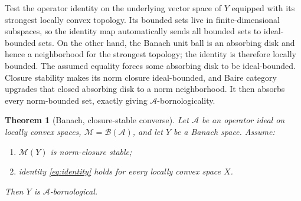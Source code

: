 \documentclass[11pt]{article}
\newtheorem{theorem}{Theorem}
\newcommand{\A}{\mathcal A}
\newcommand{\M}{\mathcal M}
\begin{document}
Test the operator identity on the underlying vector space of $Y$ equipped
with its strongest locally convex topology.  Its bounded sets live in
finite-dimensional subspaces, so the identity map automatically sends all
bounded sets to ideal-bounded sets.  On the other hand, the Banach unit ball
is an absorbing disk and hence a neighborhood for the strongest topology;
the identity is therefore locally bounded.  The assumed equality forces some
absorbing disk to be ideal-bounded.  Closure stability makes its norm closure
ideal-bounded, and Baire category upgrades that closed absorbing disk to a
norm neighborhood.  It then absorbs every norm-bounded set, exactly giving
$\A$-bornologicality.

\begin{theorem}[Banach, closure-stable converse]\label{thm:main}
Let $\A$ be an operator ideal on locally convex spaces,
$\M=\mathcal B(\A)$, and let $Y$ be a Banach space.  Assume:
\begin{enumerate}
\item $\M(Y)$ is norm-closure stable;
\item identity \eqref{eq:identity} holds for every locally convex space $X$.
\end{enumerate}
Then $Y$ is $\A$-bornological.
\end{theorem}
\end{document}
